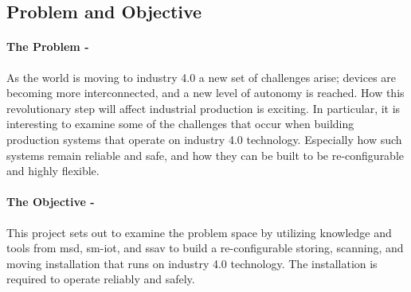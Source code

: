 \subsection{Problem and Objective}\label{sec:problem-objective}

\paragraph{The Problem -} As the world is moving to industry 4.0 a new set of challenges arise; devices are becoming more interconnected, and a new level of autonomy is reached. How this revolutionary step will affect industrial production is exciting. In particular, it is interesting to examine some of the challenges that occur when building production systems that operate on industry 4.0 technology. Especially how such systems remain reliable and safe, and how they can be built to be re-configurable and highly flexible. 

\paragraph{The Objective  -} This project sets out to examine the problem space by utilizing knowledge and tools from \acrlong{msd}, \acrlong{sm-iot}, and \acrlong{ssav} to build a re-configurable storing, scanning, and moving installation that runs on industry 4.0 technology. The installation is required to operate reliably and safely.